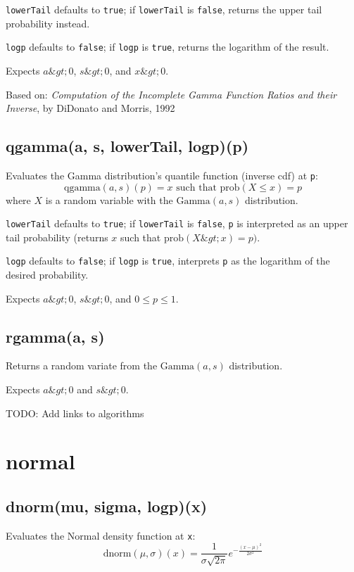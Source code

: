 \documentclass{article}
\begin{document}
\texttt{lowerTail} defaults to \texttt{true}; if \texttt{lowerTail} is \texttt{false}, returns
the upper tail probability instead.


\texttt{logp} defaults to \texttt{false}; if \texttt{logp} is \texttt{true}, returns the logarithm
of the result.


Expects $a \&gt; 0$, $s \&gt; 0$, and $x \&gt; 0$.


Based on: \emph{Computation of the Incomplete Gamma Function Ratios and their
Inverse}, by DiDonato and Morris, 1992


    \subsection*{qgamma(a, s, lowerTail, logp)(p)}
    Evaluates the Gamma distribution's quantile function (inverse cdf) at \texttt{p}:
$$\textrm{qgamma}(a, s)(p) = x \textrm{ such that } \textrm{prob}(X \leq x) = p$$
where $X$ is a random variable with the $\textrm{Gamma}(a, s)$ distribution.


\texttt{lowerTail} defaults to \texttt{true}; if \texttt{lowerTail} is \texttt{false}, \texttt{p} is
interpreted as an upper tail probability (returns
$x$ such that $\textrm{prob}(X \&gt; x) = p)$.


\texttt{logp} defaults to \texttt{false}; if \texttt{logp} is \texttt{true}, interprets \texttt{p} as
the logarithm of the desired probability.


Expects $a\&gt;0$, $s\&gt;0$, and $0 \leq p \leq 1$.


    \subsection*{rgamma(a, s)}
    Returns a random variate from the $\textrm{Gamma}(a, s)$ distribution.


Expects $a \&gt; 0$ and $s \&gt; 0$.


TODO: Add links to algorithms


  \section{normal}
    \subsection*{dnorm(mu, sigma, logp)(x)}
    Evaluates the Normal density function at \texttt{x}:
$$\textrm{dnorm}(\mu, \sigma)(x) = \frac{1}{\sigma \sqrt{2\pi}} e^{\displaystyle -\frac{(x-\mu)^2}{2\sigma^2}}$$
\end{document}
